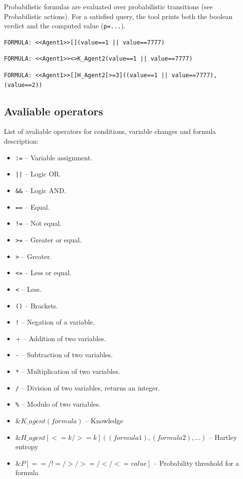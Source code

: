 \documentclass[12pt]{article}
\begin{document}
Probabilistic formulas are evaluated over probabilistic transitions (see Probabilistic actions). For a satisfied query, the tool prints both the boolean verdict and the computed value (\verb|p=...|).
\begin{lstlisting}[title={A formula that checks if there is a strategy that globally Agent1 could take such actions that the value will be always equal to 1 or 7777.}]
  FORMULA: <<Agent1>>[](value==1 || value==7777)
\end{lstlisting}
\begin{lstlisting}[title={A formula that uses a knowledge operator.}]
  FORMULA: <<Agent1>><>K_Agent2(value==1 || value==7777)
\end{lstlisting}
\begin{lstlisting}[title={A formula that uses a Hartley operator.}]
  FORMULA: <<Agent1>>[]H_Agent2[>=3]((value==1 || value==7777),(value==2))
\end{lstlisting}

\subsection{Avaliable operators}
List of avaliable operators for conditions, variable changes and formula description:
\begin{itemize}
  \item \verb+:=+ -- Variable assignment.
  \item \verb+||+ -- Logic OR.
  \item \verb+&&+ -- Logic AND.
  \item \verb+==+ -- Equal.
  \item \verb+!=+ -- Not equal.
  \item \verb+>=+ -- Greater or equal.
  \item \verb+>+ -- Greater.
  \item \verb+<=+ -- Less or equal.
  \item \verb+<+ -- Less.
  \item \verb+()+ -- Brackets.
  \item \verb+!+ -- Negation of a variable.
  \item \verb+++ -- Addition of two variables.
  \item \verb+-+ -- Subtraction of two variables.
  \item \verb+*+ -- Multiplication of two variables.
  \item \verb+/+ -- Division of two variables, returns an integer.
  \item \verb+%+ -- Modulo of two variables.
  \item $\&K{\_}agent(formula)$ -- Knowledge
  \item $\&H{\_}agent[<=k/>=k]((formula1), (formula2), ...)$ -- Hartley entropy
  \item $\&P[==/!=/>/>=/</<=value]$ -- Probability threshold for a formula
\end{itemize}
\end{document}
